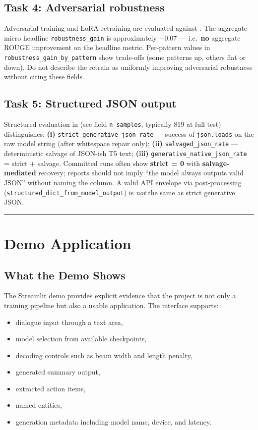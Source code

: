 \documentclass[11pt,a4paper]{article}
\newcommand{\sectionrule}{\vspace{6pt}\hrule\vspace{10pt}}
\newcommand{\tightitem}{\setlength\itemsep{2pt}\setlength\parskip{0pt}}
\begin{document}
\subsection{Task 4: Adversarial robustness}

Adversarial training and LoRA retraining are evaluated against . The aggregate micro headline \texttt{robustness\_gain} is approximately \textbf{$-0.07$} --- i.e.\ \textbf{no} aggregate ROUGE improvement on the headline metric. Per-pattern values in \texttt{robustness\_gain\_by\_pattern} show trade-offs (some patterns up, others flat or down). Do not describe the retrain as uniformly improving adversarial robustness without citing these fields.

\subsection{Task 5: Structured JSON output}

Structured evaluation in  (see field \texttt{n\_samples}, typically 819 at full test) distinguishes: \textbf{(i)} \texttt{strict\_generative\_json\_rate} --- success of \texttt{json.loads} on the raw model string (after whitespace repair only); \textbf{(ii)} \texttt{salvaged\_json\_rate} --- deterministic salvage of JSON-ish T5 text; \textbf{(iii)} \texttt{generative\_native\_json\_rate} = strict + salvage. Committed runs often show \textbf{strict = 0} with \textbf{salvage-mediated} recovery; reports should not imply ``the model always outputs valid JSON'' without naming the column. A valid API envelope via post-processing (\texttt{structured\_dict\_from\_model\_output}) is \emph{not} the same as strict generative JSON.

\sectionrule

\section{Demo Application}

\subsection{What the Demo Shows}

The Streamlit demo provides explicit evidence that the project is not only a training pipeline but also a usable application. The interface supports:

\begin{itemize}\tightitem
\item dialogue input through a text area,
\item model selection from available checkpoints,
\item decoding controls such as beam width and length penalty,
\item generated summary output,
\item extracted action items,
\item named entities,
\item generation metadata including model name, device, and latency.
\end{itemize}
\end{document}
